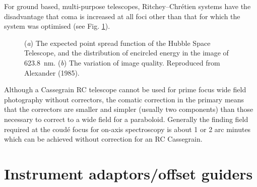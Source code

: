 For ground based, multi-purpose telescopes, \mbox{Ritchey--Chr\'etien}
systems have the disadvantage that coma is increased at all foci other
than that for which the system was optimised (see Fig. \ref{fig1}).
\begin{figure}
 \vspace{350pt}
 \caption{({\it a\/}) The expected point spread function of the Hubble Space
              Telescope, and the distribution of encircled energy in
              the image of \mbox{623.8 nm.}
 ({\it b\/}) The variation of image quality. Reproduced from Alexander (1985).}
 \label{fig1}
\end{figure}
Although a Cassegrain RC telescope cannot be used for prime focus wide
field photography without correctors, the comatic correction in the
primary means that the correctors are smaller and simpler (usually
two components) than those necessary to correct to a wide field for
a paraboloid. Generally the finding field required at the coud\'e focus
for on-axis spectroscopy is about 1 or 2 arc minutes which can be
achieved without correction for an RC Cassegrain.

\section{Instrument adaptors/offset guiders}

